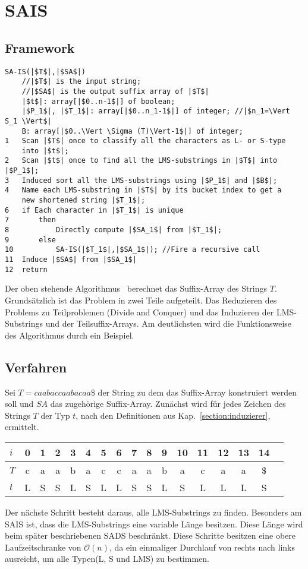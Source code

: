 \section{SAIS}
\subsection{Framework}
\label{saisAlg}
\begin{verbatim}
SA-IS(|$T$|,|$SA$|)
    //|$T$| is the input string;
    //|$SA$| is the output suffix array of |$T$|
    |$t$|: array[|$0..n-1$|] of boolean;
    |$P_1$|, |$T_1$|: array[|$0..n_1-1$|] of integer; //|$n_1=\Vert S_1 \Vert$|
    B: array[|$0..\Vert \Sigma (T)\Vert-1$|] of integer;
1   Scan |$T$| once to classify all the characters as L- or S-type
    into |$t$|;
2   Scan |$t$| once to find all the LMS-substrings in |$T$| into |$P_1$|;
3   Induced sort all the LMS-substrings using |$P_1$| and |$B$|;
4   Name each LMS-substring in |$T$| by its bucket index to get a
    new shortened string |$T_1$|;
6   if Each character in |$T_1$| is unique
7       then
8           Directly compute |$SA_1$| from |$T_1$|;
9       else
10          SA-IS(|$T_1$|,|$SA_1$|); //Fire a recursive call
11  Induce |$SA$| from |$SA_1$|
12  return
\end{verbatim}
Der oben stehende Algorithmus~\cite[fig.~1]{saca:6} berechnet das Suffix-Array des Strings $T$. Grundsätzlich ist das Problem in zwei Teile aufgeteilt. Das Reduzieren des Problems zu Teilproblemen (Divide and Conquer) und das Induzieren der LMS-Substrings und der Teilsuffix-Arrays. Am deutlichsten wird die Funktionsweise des Algorithmus durch ein Beispiel.

\subsection{Verfahren}
Sei $T=caabaccaabacaa\$$ der String zu dem das Suffix-Array konstruiert werden soll und $SA$ das zugehörige Suffix-Array. Zunächst wird für jedes Zeichen des Strings $T$ der Typ $t$, nach den Definitionen aus Kap.~\ref{section:induzierer}, ermittelt.

\begin{center}
  \begin{tabular}{ | l | c | c | c | c | c | c | c | c | c | c | c | c | c | c | c | c | }
    \hline
        $i$ & 0 & 1 & 2 & 3 & 4 & 5 & 6 & 7 & 8 & 9 & 10 & 11 & 12 & 13 & 14 \\ \hline
        $T$ & c & a & a & b & a & c & c & a & a & b & a & c & a & a & \$ \\ \hline
        $t$ & L & S & S & L & S & L & L & S & S & L & S & L & L & L & S \\
    \hline
  \end{tabular}
\end{center}
\bigskip
Der nächste Schritt besteht daraus, alle LMS-Substrings zu finden. Besonders am SAIS ist, dass die LMS-Substrings eine variable Länge besitzen. Diese Länge wird beim später beschriebenen SADS beschränkt. Diese Schritte besitzen eine obere Laufzeitschranke von $\mathcal{O}(n)$, da ein einmaliger Durchlauf von rechts nach links ausreicht, um alle Typen(L, S und LMS) zu bestimmen.

